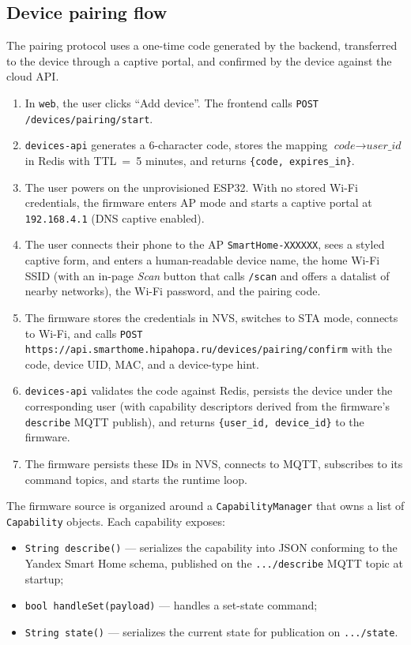 \documentclass[a4paper,12pt]{article}
\begin{document}
\subsection{Device pairing flow}

The pairing protocol uses a one-time code generated by the backend, transferred to the device through a captive portal, and confirmed by the device against the cloud API.

\begin{enumerate}
  \item In \verb|web|, the user clicks ``Add device''. The frontend calls \verb|POST /devices/pairing/start|.
  \item \verb|devices-api| generates a 6-character code, stores the mapping $\textit{code}\to\textit{user\_id}$ in Redis with TTL~=~5 minutes, and returns \verb|{code, expires_in}|.
  \item The user powers on the unprovisioned ESP32. With no stored Wi-Fi credentials, the firmware enters AP mode and starts a captive portal at \verb|192.168.4.1| (DNS captive enabled).
  \item The user connects their phone to the AP \verb|SmartHome-XXXXXX|, sees a styled captive form, and enters a human-readable device name, the home Wi-Fi SSID (with an in-page \emph{Scan} button that calls \verb|/scan| and offers a datalist of nearby networks), the Wi-Fi password, and the pairing code.
  \item The firmware stores the credentials in NVS, switches to STA mode, connects to Wi-Fi, and calls \verb|POST https://api.smarthome.hipahopa.ru/devices/pairing/confirm| with the code, device UID, MAC, and a device-type hint.
  \item \verb|devices-api| validates the code against Redis, persists the device under the corresponding user (with capability descriptors derived from the firmware's \verb|describe| MQTT publish), and returns \verb|{user_id, device_id}| to the firmware.
  \item The firmware persists these IDs in NVS, connects to MQTT, subscribes to its command topics, and starts the runtime loop.
\end{enumerate}

The firmware source is organized around a \verb|CapabilityManager| that owns a list of \verb|Capability| objects. Each capability exposes:

\begin{itemize}
  \item \verb|String describe()| --- serializes the capability into JSON conforming to the Yandex Smart Home schema, published on the \verb|.../describe| MQTT topic at startup;
  \item \verb|bool handleSet(payload)| --- handles a set-state command;
  \item \verb|String state()| --- serializes the current state for publication on \verb|.../state|.
\end{itemize}
\end{document}
